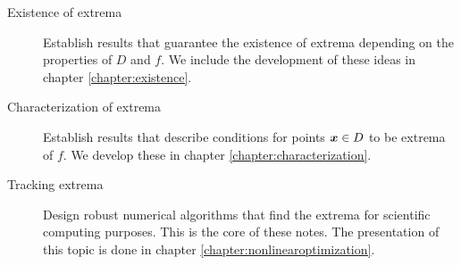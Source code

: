\begin{description}
	\item[Existence of extrema] Establish results that guarantee the existence of extrema depending on the properties of $D$ and $f$.  We include the development of these ideas in chapter \ref{chapter:existence}.
	\item[Characterization of extrema] Establish results that describe conditions for points $\boldsymbol{x} \in D$ to be extrema of $f$.  We develop these in chapter \ref{chapter:characterization}.
	\item[Tracking extrema] Design robust numerical algorithms that find the extrema for scientific computing purposes. This is the core of these notes.  The presentation of this topic is done in chapter \ref{chapter:nonlinearoptimization}.
\end{description}